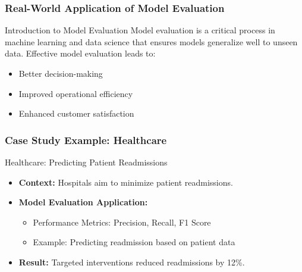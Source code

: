 \documentclass[aspectratio=169]{beamer}
\begin{document}
\begin{frame}[fragile]
    \frametitle{Real-World Application of Model Evaluation}
    \begin{block}{Introduction to Model Evaluation}
        Model evaluation is a critical process in machine learning and data science that ensures models generalize well to unseen data.
        Effective model evaluation leads to:
        \begin{itemize}
            \item Better decision-making
            \item Improved operational efficiency
            \item Enhanced customer satisfaction
        \end{itemize}
    \end{block}
\end{frame}

\begin{frame}[fragile]
    \frametitle{Case Study Example: Healthcare}
    \begin{block}{Healthcare: Predicting Patient Readmissions}
        \begin{itemize}
            \item \textbf{Context:} Hospitals aim to minimize patient readmissions.
            \item \textbf{Model Evaluation Application:}
                \begin{itemize}
                    \item Performance Metrics: Precision, Recall, F1 Score
                    \item Example: Predicting readmission based on patient data
                \end{itemize}
            \item \textbf{Result:} Targeted interventions reduced readmissions by 12\%.
        \end{itemize}
    \end{block}
\end{frame}
\end{document}
